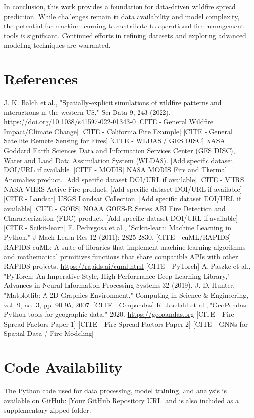 \documentclass[conference]{IEEEtran}
\begin{document}
In conclusion, this work provides a foundation for data-driven wildfire spread prediction. While challenges remain in data availability and model complexity, the potential for machine learning to contribute to operational fire management tools is significant. Continued efforts in refining datasets and exploring advanced modeling techniques are warranted.

\section*{References} %

\begin{thebibliography}{00}
 J. K. Balch et al., "Spatially-explicit simulations of wildfire patterns and interactions in the western US," Sci Data 9, 243 (2022). \url{https://doi.org/10.1038/s41597-022-01343-0}
 [CITE - General Wildfire Impact/Climate Change]
 [CITE - California Fire Example]
 [CITE - General Satellite Remote Sensing for Fires]
 [CITE - WLDAS / GES DISC] NASA Goddard Earth Sciences Data and Information Services Center (GES DISC), Water and Land Data Assimilation System (WLDAS). [Add specific dataset DOI/URL if available]
 [CITE - MODIS] NASA MODIS Fire and Thermal Anomalies product. [Add specific dataset DOI/URL if available]
 [CITE - VIIRS] NASA VIIRS Active Fire product. [Add specific dataset DOI/URL if available]
 [CITE - Landsat] USGS Landsat Collection. [Add specific dataset DOI/URL if available]
 [CITE - GOES] NOAA GOES-R Series ABI Fire Detection and Characterization (FDC) product. [Add specific dataset DOI/URL if available]
 [CITE - Scikit-learn] F. Pedregosa et al., "Scikit-learn: Machine Learning in Python," J Mach Learn Res 12 (2011): 2825-2830.
 [CITE - cuML/RAPIDS] RAPIDS cuML: A suite of libraries that implement machine learning algorithms and mathematical primitives functions that share compatible APIs with other RAPIDS projects. \url{https://rapids.ai/cuml.html}
 [CITE - PyTorch] A. Paszke et al., "PyTorch: An Imperative Style, High-Performance Deep Learning Library," Advances in Neural Information Processing Systems 32 (2019).
 J. D. Hunter, "Matplotlib: A 2D Graphics Environment," Computing in Science \& Engineering, vol. 9, no. 3, pp. 90-95, 2007.
 [CITE - Geopandas] K. Jordahl et al., "GeoPandas: Python tools for geographic data," 2020. \url{https://geopandas.org}
 [CITE - Fire Spread Factors Paper 1]
 [CITE - Fire Spread Factors Paper 2]
 [CITE - GNNs for Spatial Data / Fire Modeling]
\end{thebibliography}

\section*{Code Availability}
The Python code used for data processing, model training, and analysis is available on GitHub: [Your GitHub Repository URL] and is also included as a supplementary zipped folder.
\end{document}
